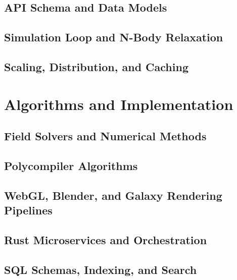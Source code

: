 \documentclass[11pt,oneside]{book}
\begin{document}
\chapter{API Schema and Data Models}


\chapter{Simulation Loop and N-Body Relaxation}


\chapter{Scaling, Distribution, and Caching}



\part{Algorithms and Implementation}

\chapter{Field Solvers and Numerical Methods}


\chapter{Polycompiler Algorithms}


\chapter{WebGL, Blender, and Galaxy Rendering Pipelines}


\chapter{Rust Microservices and Orchestration}


\chapter{SQL Schemas, Indexing, and Search}

\end{document}
